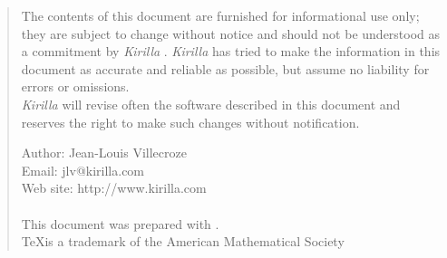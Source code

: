 \documentclass[twoside,10pt,openany]{report}
\newcommand{\etech}{{\em Kirilla} }
\newcommand{\web}{http://www.kirilla.com}
\newcounter{sc}[chapter]
\begin{document}
\begin{quote}
\begin{small}
The contents of this document are furnished for informational use only; they are subject to change without notice and should not be understood as a commitment by \etech. \etech has tried to make the information in this document as accurate and reliable as possible, but assume no liability for errors or omissions.\\

\etech will revise often the software described in this document and reserves the right to make such changes without notification.\\

\vspace{1cm}

Author: Jean-Louis Villecroze\\
Email: jlv@kirilla.com\\
Web site: \web\\
\\
This document was prepared with \LaTeXe.\\
\TeX is a trademark of the American Mathematical Society
\end{small}
\end{quote}
 
 
\end{document}
